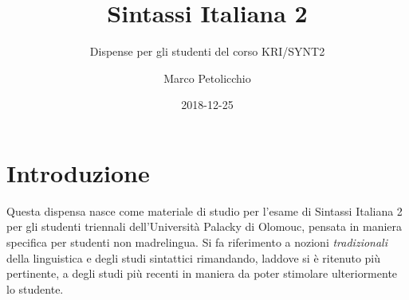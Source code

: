 \documentclass[a4paper,twoside,11pt,chapterprefix=false,bibliography=totocnumbered,listof=flat]{scrbook}
\title{Sintassi Italiana 2}
\subtitle{Dispense per gli studenti del corso KRI/SYNT2}
\author{Marco Petolicchio}
\date{2018-12-25}
\makeatletter
\newcommand\HUGE{\@setfontsize\Huge{36}{48}}
\makeatother
\begin{document}
\maketitle

\makeatletter
{}
\makeatother
\nopagecolor%
\pagecolor{white}

{
\setcounter{tocdepth}{1}
\tableofcontents
}
\listoftables
\listoffigures
\chapter*{Introduzione}\label{introduzione}

Questa dispensa nasce come materiale di studio per l'esame di Sintassi
Italiana 2 per gli studenti triennali dell'Università Palacky di
Olomouc, pensata in maniera specifica per studenti non madrelingua. Si
fa riferimento a nozioni \emph{tradizionali} della linguistica e degli
studi sintattici rimandando, laddove si è ritenuto più pertinente, a
degli studi più recenti in maniera da poter stimolare ulteriormente lo
studente.
\end{document}
